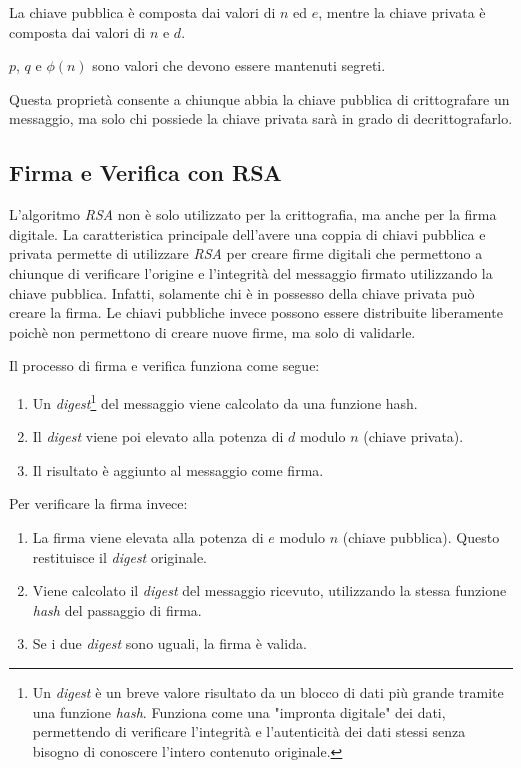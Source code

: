 La chiave pubblica è composta dai valori di $n$ ed $e$, mentre la chiave privata è composta dai valori di $n$ e $d$.

$p$, $q$ e $\phi(n)$ sono valori che devono essere mantenuti segreti.

Questa proprietà consente a chiunque abbia la chiave pubblica di crittografare un messaggio, ma solo chi possiede la chiave privata sarà in grado di decrittografarlo.

\subsection{Firma e Verifica con RSA}
\label{sec:rsassa}

L'algoritmo \emph{RSA} non è solo utilizzato per la crittografia, ma anche per la firma digitale.
La caratteristica principale dell'avere una coppia di chiavi pubblica e privata permette di utilizzare \emph{RSA} per creare firme digitali che permettono a chiunque di verificare l'origine e l'integrità del messaggio firmato utilizzando la chiave pubblica.
Infatti, solamente chi è in possesso della chiave privata può creare la firma.
Le chiavi pubbliche invece possono essere distribuite liberamente poichè non permettono di creare nuove firme, ma solo di validarle.

\noindent Il processo di firma e verifica funziona come segue:
\begin{enumerate}
	\item Un \emph{digest}\footnote{Un \emph{digest} è un breve valore risultato da un blocco di dati più grande tramite una funzione \emph{hash}. Funziona come una "impronta digitale" dei dati, permettendo di verificare l'integrità e l'autenticità dei dati stessi senza bisogno di conoscere l'intero contenuto originale.} del messaggio viene calcolato da una funzione hash.
	\item Il \emph{digest} viene poi elevato alla potenza di $d$ modulo $n$ (chiave privata).
	\item Il risultato è aggiunto al messaggio come firma.
\end{enumerate}
\noindent Per verificare la firma invece:
\begin{enumerate}
	\item La firma viene elevata alla potenza di $e$ modulo $n$ (chiave pubblica). Questo restituisce il \emph{digest} originale.
	\item Viene calcolato il \emph{digest} del messaggio ricevuto, utilizzando la stessa funzione \emph{hash} del passaggio di firma.
	\item Se i due \emph{digest} sono uguali, la firma è valida.
\end{enumerate}

